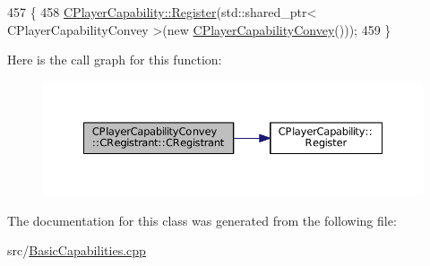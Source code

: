 \begin{DoxyCode}
457                                                \{
458     \hyperlink{classCPlayerCapability_a7e298018dcde2684451add3cfff065f7}{CPlayerCapability::Register}(std::shared\_ptr< CPlayerCapabilityConvey >(\textcolor{keyword}{new} 
      \hyperlink{classCPlayerCapabilityConvey_a49f00731755778e903503796adbbe451}{CPlayerCapabilityConvey}()));   
459 \}
\end{DoxyCode}
Here is the call graph for this function\+:
\nopagebreak
\begin{figure}[H]
\begin{center}
\leavevmode
\includegraphics[width=350pt]{classCPlayerCapabilityConvey_1_1CRegistrant_a7ceb41f660b3b73dff670952658a2883_cgraph}
\end{center}
\end{figure}


The documentation for this class was generated from the following file\+:\begin{DoxyCompactItemize}
\item 
src/\hyperlink{BasicCapabilities_8cpp}{Basic\+Capabilities.\+cpp}\end{DoxyCompactItemize}
